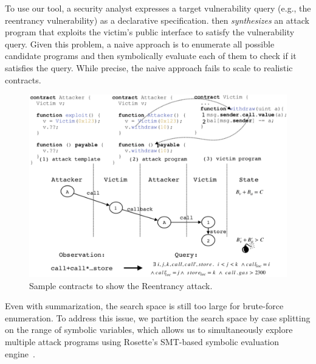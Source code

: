 To use our tool, a
security analyst expresses a target vulnerability query (e.g., the reentrancy
vulnerability) as a declarative specification.  
\toolname then \emph{synthesizes} an attack program that exploits the victim's public
interface to satisfy the vulnerability query. Given this problem, a naive
approach is to enumerate all possible candidate programs and then symbolically
evaluate each of them to check if it satisfies the query. While precise, the
naive approach fails to scale to realistic contracts. 
\begin{figure}
  \centering
  \includegraphics[scale=0.40]{motivate.pdf}
\caption{Sample contracts to show the Reentrancy attack.}
\label{fig:motivate}
\end{figure}
Even with summarization, the search space
is still too large for brute-force enumeration. To address this issue, we
partition the search space by case splitting on the range of symbolic variables,
which allows us to simultaneously explore multiple attack programs using Rosette's 
SMT-based symbolic evaluation engine~\cite{rosette}. 

